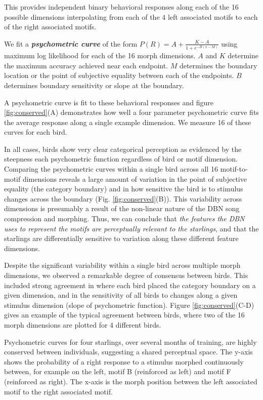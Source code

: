 

This provides independent binary behavioral responses along each of the 16 possible dimensions interpolating from each of the 4 left associated motifs to each of the right associated motifs.

We fit a \textit{\textbf{psychometric curve}} of the form $P(R) = A + \frac{K - A}{1 + e^{-B(x-M)}}$ using maximum log likelihood for each of the 16 morph dimensions. $A$ and $K$ determine the maximum accuracy achieved near each endpoint. $M$ determines the boundary location or the point of subjective equality between each of the endpoints. $B$ determines boundary sensitivity or slope at the boundary.

A psychometric curve is fit to these behavioral responses and figure \ref{fig:conserved}(A) demonstrates how well a four parameter psychometric curve fits the average response along a single example dimension. We measure 16 of these curves for each bird.

In all cases, birds show very clear categorical perception as evidenced by the steepness each psychometric function regardless of bird or motif dimension. Comparing the psychometric curves within a single bird across all 16 motif-to-motif dimensions reveals a large amount of variation in the point of subjective equality (the category boundary) and in how sensitive the bird is to stimulus changes across the boundary (Fig. \ref{fig:conserved}(B)). This variability across dimensions is presumably a result of the non-linear nature of the \ac{DBN} song compression and morphing. Thus, we can conclude that \emph{the features the DBN uses to represent the motifs are perceptually relevant to the starlings}, and that the starlings are differentially sensitive to variation along these different feature dimensions.

Despite the significant variability within a single bird across multiple morph dimensions, we observed a remarkable degree of consensus between birds.  This included strong agreement in where each bird placed the category boundary on a given dimension, and in the sensitivity of all birds to changes along a given stimulus dimension (slope of psychometric function). Figure \ref{fig:conserved}(C-D) gives an example of the typical agreement between birds, where two of the 16 morph dimensions are plotted for 4 different birds.

Psychometric curves for four starlings, over several months of training, are highly conserved between individuals, suggesting a shared perceptual space. The y-axis shows the probability of a right response to a stimulus morphed continuously between, for example on the left, motif B (reinforced as left) and motif F (reinforced as right). The x-axis is the morph position between the left associated motif to the right associated motif.


